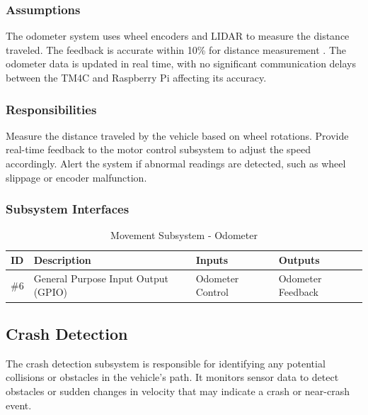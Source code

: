\subsubsection{Assumptions}
The odometer system uses wheel encoders and LIDAR to measure the distance traveled. The feedback is accurate within 10\% for distance measurement \cite{Zhang2020} \cite{Epton2012}. The odometer data is updated in real time, with no significant communication delays between the TM4C and Raspberry Pi affecting its accuracy.

\subsubsection{Responsibilities}
Measure the distance traveled by the vehicle based on wheel rotations. Provide real-time feedback to the motor control subsystem to adjust the speed accordingly. Alert the system if abnormal readings are detected, such as wheel slippage or encoder malfunction.

\subsubsection{Subsystem Interfaces}

\begin{table}[H]
\caption{Movement Subsystem - Odometer} 
\begin{center}
    \begin{tabular}{ | p{0.8cm} | p{6cm} | p{3cm} | p{4cm} |}
    \hline
    ID & Description & Inputs & Outputs  \\ \hline
    \#6 & General Purpose Input Output (GPIO) & Odometer Control & Odometer Feedback \\ \hline
    \end{tabular}
\end{center}
\end{table}

\newpage


\subsection{Crash Detection}
The crash detection subsystem is responsible for identifying any potential collisions or obstacles in the vehicle's path. It monitors sensor data to detect obstacles or sudden changes in velocity that may indicate a crash or near-crash event.

